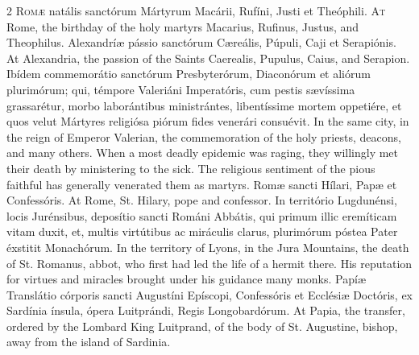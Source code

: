 \begin{paracol}{2}
\lettrine[lines=2]{R}{omæ} natális sanctórum Mártyrum Macárii, Rufíni, 
 Justi et Theóphili.
\switchcolumn
{}
\lettrine[lines=2]{A}{t} Rome, the birthday of the holy martyrs Macarius, Rufinus, Justus, and 
 Theophilus.
\switchcolumn*
{}
Alexandríæ pássio sanctórum Cæreális, Púpuli, 
 Caji et Serapiónis.
\switchcolumn
{}
At Alexandria, the passion of the Saints Caerealis, Pupulus, Caius, and 
 Serapion.
\switchcolumn*
{}
Ibídem commemorátio sanctórum Presbyterórum, Diaconórum et aliórum 
 plurimórum; qui, témpore Valeriáni Imperatóris, cum pestis sævíssima 
 grassarétur, morbo laborántibus ministrántes, libentíssime mortem oppetiére, 
 et quos velut Mártyres religiósa piórum fides venerári consuévit.
\switchcolumn
{}
In the same city, in the reign of Emperor Valerian, the commemoration of the 
 holy priests, deacons, and many others. When a most deadly epidemic 
 was raging, they willingly met their death by ministering to the sick. 
 The religious sentiment of the pious faithful has generally venerated them 
 as martyrs.
\switchcolumn*
{}
Romæ sancti Hílari, Papæ et Confessóris.
\switchcolumn
{}
At Rome, St. Hilary, pope and confessor.
\switchcolumn*
{}
In território Lugdunénsi, locis Jurénsibus, deposítio sancti Románi Abbátis, 
 qui primum illic eremíticam vitam duxit, et, multis virtútibus ac miráculis 
 clarus, plurimórum póstea Pater éxstitit Monachórum.
\switchcolumn
{}
In the territory of Lyons, in the Jura Mountains, the death of St. Romanus, 
 abbot, who first had led the life of a hermit there. His reputation 
 for virtues and miracles brought under his guidance many monks.
\switchcolumn*
{}
Papíæ Translátio córporis sancti Augustíni 
 Epíscopi, Confessóris et Ecclésiæ Doctóris, ex Sardínia ínsula, ópera 
 Luitprándi, Regis Longobardórum.
\switchcolumn
{}
At Papia, the transfer, ordered by the Lombard King Luitprand, of the body 
 of St. Augustine, bishop, away from the island of Sardinia.
\switchcolumn*
{}
\end{paracol}

